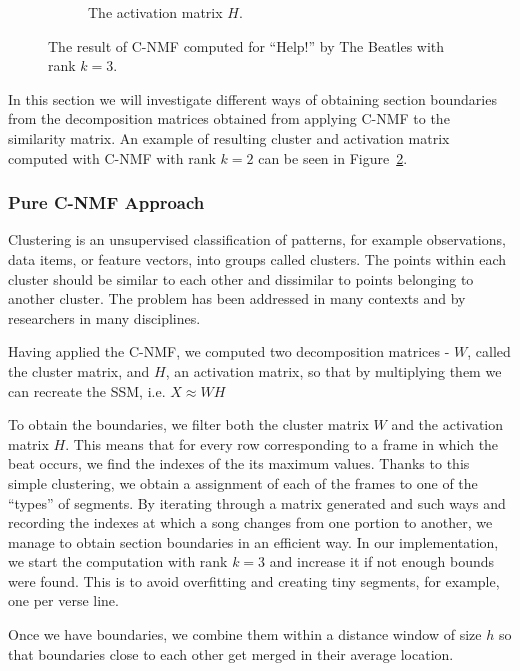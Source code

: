 \begin{figure}
\begin{subfigure}[b]{0.47\textwidth}
                \caption{The activation matrix $H$.}
                \label{fig:Hmatrix}
        \end{subfigure}
          \caption{The result of C-NMF computed for ``Help!'' by The Beatles with rank $k = 3$.}
        \label{fig:CNMFbeatles}
\end{figure}
 
In this section we will investigate different ways of obtaining section boundaries from the decomposition matrices obtained from applying C-NMF to the similarity matrix. An example of resulting cluster and activation matrix computed with C-NMF with rank $k = 2$ can be seen in Figure~\ref{fig:CNMFbeatles}.

\subsubsection*{Pure C-NMF Approach}
\label{sec:finalBounds}

Clustering is an unsupervised classification of patterns, for example observations, data items, or feature vectors, into groups called clusters. The points within each cluster should be similar to each other and dissimilar to points belonging to another cluster. The problem has been addressed in many contexts and by researchers in many disciplines.

Having applied the C-NMF, we computed two decomposition matrices - $W$, called the cluster matrix, and $H$, an activation matrix, so that by multiplying them we can recreate the SSM, i.e. $X \approx  WH$       
        
To obtain the boundaries, we filter both the cluster matrix $W$ and the activation matrix $H$. This means that for every row corresponding to a frame in which the beat occurs, we find the indexes of the its maximum values. Thanks to this simple clustering, we obtain a assignment of each of the frames to one of the ``types'' of segments. By iterating through a matrix generated and such ways and recording the indexes at which a song changes from one portion to another, we manage to obtain section boundaries in an efficient way. In our implementation, we start the computation with rank $k = 3$ and increase it if not enough bounds were found. This is to avoid overfitting and creating tiny segments, for example, one per verse line.

Once we have boundaries, we combine them within a distance window of size $h$ so that boundaries close to each other get merged in their average location.

